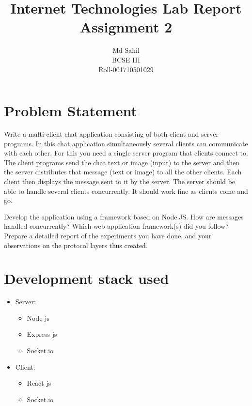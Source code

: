 \documentclass[titlepage]{article}
\title{Internet Technologies Lab Report\\Assignment 2}
\author{Md Sahil\\BCSE III\\Roll-001710501029}
\date{}
\begin{document}
    {\maketitle}

    \section{Problem Statement}
    Write a multi-client chat application consisting of both client and server programs.
    In this chat application simultaneously several clients can communicate with each other.
    For this you need a single server program that clients connect to.
    The client programs send the chat text or image (input) to the server and then the server
    distributes that message (text or image) to all the other clients.
    Each client then displays the message sent to it by the server.
    The server should be able to handle several clients concurrently.
    It should work fine as clients come and go.
    

    Develop the application using a framework based on Node.JS.\@
    How are messages handled concurrently? Which web application framework(s) did you follow?  
    Prepare a detailed report of the experiments you have done, and your observations on the protocol layers thus created.  

    \section{Development stack used}
    \begin{itemize}
        \item Server:
            \begin{itemize}
                \item Node js
                \item Express js
                \item Socket.io
            \end{itemize}
        \item Client:
            \begin{itemize}
                \item React js
                \item Socket.io
            \end{itemize}
    \end{itemize}
\end{document}
